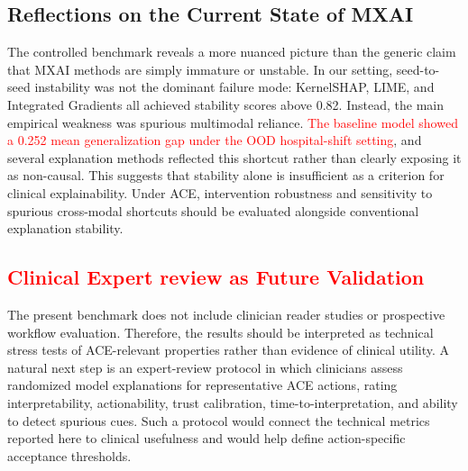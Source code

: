 \documentclass[pdflatex,sn-mathphys-num]{sn-jnl}%
\theoremstyle{thmstyleone}%
\theoremstyle{thmstyletwo}%
\theoremstyle{thmstylethree}%
\begin{document}
\begin{itemize}
\subsection{Reflections on the Current State of MXAI}

The controlled benchmark reveals a more nuanced picture than the generic claim that MXAI methods are simply immature or unstable. In our setting, seed-to-seed instability was not the dominant failure mode: KernelSHAP, LIME, and Integrated Gradients all achieved stability scores above 0.82. Instead, the main empirical weakness was spurious multimodal reliance. \textcolor{red}{The baseline model showed a 0.252 mean generalization gap under the OOD hospital-shift setting}, and several explanation methods reflected this shortcut rather than clearly exposing it as non-causal. This suggests that stability alone is insufficient as a criterion for clinical explainability. Under ACE, intervention robustness and sensitivity to spurious cross-modal shortcuts should be evaluated alongside conventional explanation stability.

\subsection{\textcolor{red}{Clinical Expert review as Future Validation}}

 The present benchmark does not include clinician reader studies or prospective workflow evaluation. Therefore, the results should be interpreted as technical stress tests of ACE-relevant properties rather than evidence of clinical utility. A natural next step is an expert-review protocol in which clinicians assess randomized model explanations for representative ACE actions, rating interpretability, actionability, trust calibration, time-to-interpretation, and ability to detect spurious cues. Such a protocol would connect the technical metrics reported here to clinical usefulness and would help define action-specific acceptance thresholds. 



\end{itemize}
\end{document}
